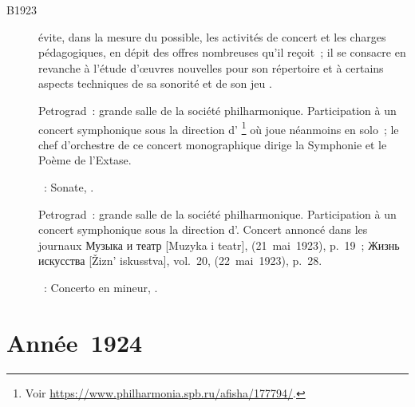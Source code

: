\begin{description}
 \item[B1923]
 \VSofronitsky{} évite, dans la mesure du possible, les activités de concert
 et les charges pédagogiques, en dépit des offres nombreuses qu'il reçoit~;
 il se consacre en revanche à l'étude d'œuvres nouvelles pour son répertoire
 et à certains aspects techniques de sa sonorité et de son jeu
 \citep[voir][p.~28]{Sofronitsky82a}.
 \item[]
 Petrograd~: grande salle de la société philharmonique.
 Participation à un concert symphonique sous la direction d'\ECooper{}%
 \footnote{Voir \href{https://www.philharmonia.spb.ru/afisha/177794/}%
 {https://www.philharmonia.spb.ru/afisha/177794/}.}
 où \VSofronitsky{} joue néanmoins en solo~; le chef d'orchestre de ce
 concert monographique dirige la Symphonie  et le Poème de
 l'\hbox{Extase}.

 \textsc{\Scriabine{}}~: Sonate, .
 \item[]
 Petrograd~: grande salle de la société philharmonique.
 Participation à un concert symphonique sous la direction d'\ECooper{}.
 Concert annoncé dans les journaux \foreignlanguage{russian}{Музыка и театр}
 [Muzyka i teatr],  (21~mai~1923), p.~19~;
 \foreignlanguage{russian}{Жизнь искусства} [Žizn' iskusstva], vol.~20,
  (22~mai~1923), p.~28.

 \textsc{\Scriabine{}}~: Concerto en \kF \Sharp mineur, .
\end{description}

\section{Année~1924}

